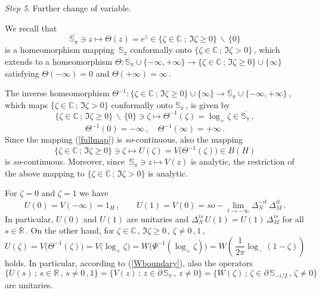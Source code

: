\documentclass[reqno]{amsart}
\theoremstyle{definition}
\theoremstyle{remark}
\numberwithin{equation}{section}
\theoremstyle{plain}
\begin{document}
{\it Step 5}. {\sc Further change of variable.}
\medskip

We recall that
\begin{equation*}
\overline{\mathbb S_\pi}\ni z\longmapsto \Theta (z)=e^z\in
\{\zeta\in\mathbb C\; ;\, \Im\zeta \geq 0\}\,\backslash\,\{ 0\}
\end{equation*}
is a homeomorphism mapping $\,\mathbb S_\pi$ conformally onto
$\{\zeta\in\mathbb C\, ;\, \Im\zeta >0\}\,$, which extends to a
homeomorphism $\Theta : \overline{\mathbb S_\pi}\cup\{ -\infty
,+\infty\}\longrightarrow\{\zeta\in\mathbb C\, ;\,\Im\zeta\geq 0\}
\cup\{\infty\}$ satisfying $\Theta (-\infty )=0$ and $\Theta
(+\infty )=\infty\,$.

The inverse homeomorphism $\Theta^{-1} : \{\zeta\in\mathbb C\,
;\,\Im\zeta\geq 0\}\cup\{\infty\}\longrightarrow
\overline{\mathbb S_\pi}\cup\{ -\infty ,+\infty\}\,$,
which maps $\{\zeta\in\mathbb C\, ;\, \Im\zeta >0\}$ conformally
onto $\mathbb S_\pi\,$, is given by
\begin{equation*}
\{\zeta\in\mathbb C\, ;\,\Im\zeta\geq 0\}\,\backslash\,\{ 0\}
\ni \zeta\longmapsto \Theta^{-1} (\zeta )=\log_+ \zeta\in
\overline{\mathbb S_\pi}\, ,
\end{equation*}
\begin{equation*}
\Theta^{-1}(0)=-\infty\, ,\quad \Theta^{-1}(\infty )=+\infty\, .
\end{equation*}
Since the mapping (\ref{fullmap}) is $so$-continuous, also the
mapping
\begin{equation*}
\{\zeta\in\mathbb C\, ;\,\Im\zeta\geq 0\}\ni \zeta\longmapsto
U(\zeta )=V\big(\Theta^{-1}(\zeta )\big)\in B(H)
\end{equation*}
is $so$-continuous. Moreover, since $\,\mathbb S_\pi\ni z
\longmapsto V(z)$ is analytic, the restriction of the above
mapping to $\{\zeta\in\mathbb C\, ;\, \Im\zeta >0\}$ is analytic.

For $\zeta =0$ and $\zeta =1$ we have
\begin{equation*}
U(0)=V(-\infty )=1_H\, ,\qquad U(1)=V(0)=so-\lim_{t\to -\infty}
\Delta_N^{-it}\,\Delta_M^{it}\, .
\end{equation*}
In particular, $U(0)$ and $U(1)$ are unitaries and
$\Delta_N^{is}\, U(1)=U(1)\,\Delta_M^{is}$ for all $s\in
\mathbb R\,$.
On the other hand, for $\zeta\in\mathbb C\, ,\,\Im \zeta\geq 0\,$,
$\zeta\neq 0\, , 1\,$,
\begin{equation*}
U(\zeta )=
V\big(\Theta^{-1}(\zeta )\big) =
V\big(\log_+ \zeta \big) =W\big(\Psi^{-1}(\log_+ \zeta )\big) =
W\left(\, \frac 1{2 \pi} \log_- (1-\zeta )\right)
\end{equation*}
holds. In particular, according to (\ref{Wboundary}), also the
operators
\begin{equation*}
\{ U(s)\, ;\, s\in\mathbb R\, ,\, s\neq 0\, , 1\} =
\{ V(z)\, ;\, z\in\partial\,\mathbb S_\pi\, ,\, z\neq 0\} =
\{ W(\zeta )\, ;\,\zeta\in\partial\,\mathbb S_{-i/2}\, ,\,\zeta
\neq 0\}
\end{equation*}
are unitaries.
\end{document}
